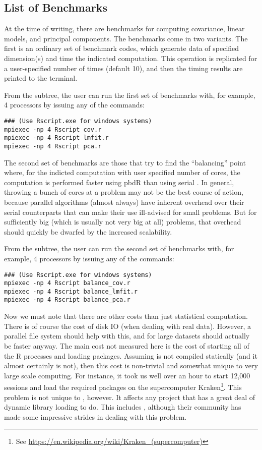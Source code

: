 




\subsection{List of Benchmarks}

At the time of writing, there are benchmarks for computing covariance, linear models, and principal components.  The benchmarks come in two variants.  The first is an ordinary set of benchmark codes, which generate data of specified dimension(s) and time the indicated computation.  This operation is replicated for a user-specified number of times (default 10), and then the timing results are printed to the terminal.  

From the  subtree, the user can run the first set of benchmarks with, for example, 4 processors by issuing any of the commands:
\begin{lstlisting}
### (Use Rscript.exe for windows systems)
mpiexec -np 4 Rscript cov.r
mpiexec -np 4 Rscript lmfit.r
mpiexec -np 4 Rscript pca.r
\end{lstlisting}

The second set of benchmarks are those that try to find the ``balancing'' point where, for the indicted computation with user specified number of cores, the computation is performed faster using pbdR than using serial .  In general, throwing a bunch of cores at a problem may not be the best course of action, because parallel algorithms (almost always) have inherent overhead over their serial counterparts that can make their use ill-advised for small problems.  But for sufficiently big (which is usually not very big at all) problems, that overhead should quickly be dwarfed by the increased scalability.

From the  subtree, the user can run the second set of benchmarks with, for example, 4 processors by issuing any of the commands:
\begin{lstlisting}
### (Use Rscript.exe for windows systems)
mpiexec -np 4 Rscript balance_cov.r
mpiexec -np 4 Rscript balance_lmfit.r
mpiexec -np 4 Rscript balance_pca.r
\end{lstlisting}

Now we must note that there are other costs than just statistical computation.  There is of course the cost of disk IO (when dealing with real data).  However, a parallel file system should help with this, and for large datasets should actually be faster anyway.  The main cost not measured here is the cost of starting all of the R processes and loading packages.  Assuming  is not compiled statically (and it almost certainly is not), then this cost is non-trivial and somewhat unique to very large scale computing.  For instance, it took us well over an hour to start 12,000  sessions and load the required packages on the supercomputer Kraken\footnote{See \url{https://en.wikipedia.org/wiki/Kraken_(supercomputer)}}.  This problem is not unique to , however.  It affects any project that has a great deal of dynamic library loading to do.  This includes , although their community has made some impressive strides in dealing with this problem.
